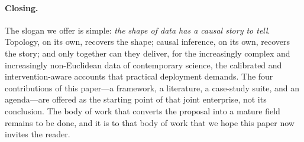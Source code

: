 \paragraph{Closing.}
The slogan we offer is simple: \emph{the shape of data has a causal
story to tell}. Topology, on its own, recovers the shape; causal
inference, on its own, recovers the story; and only together can they
deliver, for the increasingly complex and increasingly non-Euclidean
data of contemporary science, the calibrated and intervention-aware
accounts that practical deployment demands. The four contributions of
this paper---a framework, a literature, a case-study suite, and an
agenda---are offered as the starting point of that joint enterprise,
not its conclusion. The body of work that converts the proposal into
a mature field remains to be done, and it is to that body of work
that we hope this paper now invites the reader.
